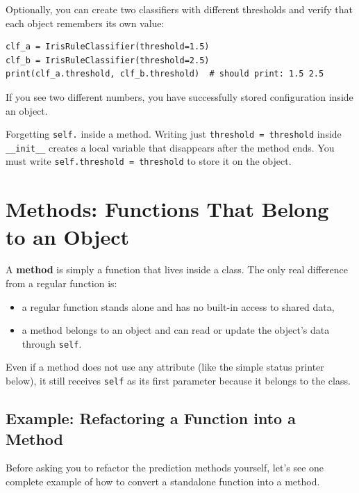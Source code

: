 \begin{tcolorbox}[title=Checkpoint]
Optionally, you can create two classifiers with different thresholds and verify that each object remembers its own value:
\begin{verbatim}
clf_a = IrisRuleClassifier(threshold=1.5)
clf_b = IrisRuleClassifier(threshold=2.5)
print(clf_a.threshold, clf_b.threshold)  # should print: 1.5 2.5
\end{verbatim}
If you see two different numbers, you have successfully stored configuration inside an object.
\end{tcolorbox}

\begin{tcolorbox}[title=Common Mistake]
Forgetting \texttt{self.} inside a method.
Writing just \texttt{threshold = threshold} inside \texttt{\_\_init\_\_} creates a local variable that disappears after the method ends.
You must write \texttt{self.threshold = threshold} to store it on the object.
\end{tcolorbox}

\section{Methods: Functions That Belong to an Object}

A \textbf{method} is simply a function that lives inside a class.
The only real difference from a regular function is:
\begin{itemize}\setlength{\itemsep}{2pt}
    \item a regular function stands alone and has no built-in access to shared data,
    \item a method belongs to an object and can read or update the object's data through \texttt{self}.
\end{itemize}

\noindent
Even if a method does not use any attribute (like the simple status printer below), it still receives \texttt{self} as its first parameter because it belongs to the class.

\subsection{Example: Refactoring a Function into a Method}

Before asking you to refactor the prediction methods yourself, let's see one complete example of how to convert a standalone function into a method.

